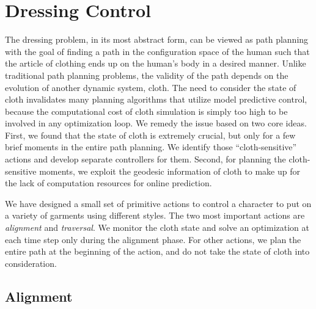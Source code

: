 \section{Dressing Control}

The dressing problem, in its most abstract form, can be viewed as path planning with the goal of finding a path in the configuration space of the human such that the article of clothing ends up on the human's body in a desired manner. Unlike traditional path planning problems, the validity of the path depends on the evolution of another dynamic system, cloth. The need to consider the state of cloth invalidates many planning algorithms that utilize model predictive control, because the computational cost of cloth simulation is simply too high to be involved in any optimization loop. We remedy the issue based on two core ideas. First, we found that the state of cloth is extremely crucial, but only for a few brief moments in the entire path planning. We identify those ``cloth-sensitive'' actions and develop separate controllers for them. Second, for planning the cloth-sensitive moments, we exploit the geodesic information of cloth to make up for the lack of computation resources for online prediction.

We have designed a small set of primitive actions to control a character to put on a variety of garments using different styles. The two most important actions are \emph{alignment} and \emph{traversal}. We monitor the cloth state and solve an optimization at each time step only during the alignment phase. For other actions, we plan the entire path at the beginning of the action, and do not take the state of cloth into consideration.



\subsection{Alignment}

